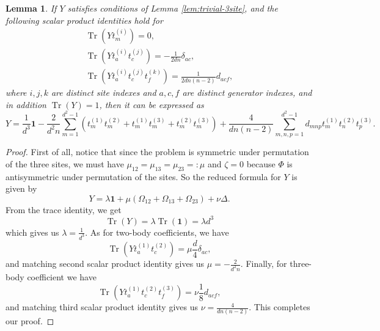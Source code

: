 \documentclass[11pt,letterpaper]{article}
\theoremstyle{plain}
\theoremstyle{plain}
\theoremstyle{plain}
\theoremstyle{plain}
\theoremstyle{plain}
\theoremstyle{plain}
\theoremstyle{plain}
\newtheorem{smlemma}[smtheorem]{Lemma}
\theoremstyle{definition}
\theoremstyle{plain}
\begin{document}
\begin{smlemma}\label{lem:covar_3-site_scalar_operator}
    If $Y$ satisfies conditions of Lemma \ref{lem:trivial-3site}, and the following scalar product identities hold for 
    \[
        \begin{gathered}
            \operatorname{Tr}\left(Y t_m^{(i)}\right)=0,\\
            \operatorname{Tr}\left(Y t_a^{(i)} t_c^{(j)}\right)=-\frac{1}{2 d n} \delta_{a c},\\
            \operatorname{Tr}\left(Y t_a^{(i)} t_c^{(j)} t_f^{(k)}\right)=\frac{1}{2 d n(n-2)} d_{a c f},
        \end{gathered}
    \]
    where $i, j, k$ are distinct site indexes and $a, c, f$ are distinct generator indexes, and in addition $\operatorname{Tr}(Y)=1$, then it can be expressed as
    \[
        Y=\frac{1}{d^3} \mathbf{1}-\frac{2}{d^2 n} \sum_{m=1}^{d^2-1}\left(t_m^{(1)} t_m^{(2)}+t_m^{(1)} t_m^{(3)}+t_m^{(2)} t_m^{(3)}\right)+\frac{4}{d n(n-2)} \sum_{m, n, p=1}^{d^2-1} d_{m n p} t_m^{(1)} t_n^{(2)} t_p^{(3)} .
    \]
\end{smlemma}

\begin{proof}
    First of all, notice that since the problem is symmetric under permutation of the three sites, we must have $\mu_{12}=\mu_{13}=\mu_{23}=: \mu$ 
    and $\zeta=0$ because $\Phi$ is antisymmetric under permutation of the sites. So the reduced formula for $Y$ is given by
    \[
        Y=\lambda \mathbf{1}+\mu\left(\Omega_{12}+\Omega_{13}+\Omega_{23}\right)+\nu \Delta.
    \]
    From the trace identity, we get
    \[
        \operatorname{Tr}(Y)=\lambda \operatorname{Tr}(\mathbf{1})=\lambda d^3
    \]
    which gives us $\lambda=\frac{1}{d^3}$.
    As for two-body coefficients, we have
    \[
        \operatorname{Tr}\left(Y t_a^{(1)} t_c^{(2)}\right)=\mu \frac{d}{4} \delta_{a c},
    \]
    and matching second scalar product identity gives us $\mu=-\frac{2}{d^2 n}$.
    Finally, for three-body coefficient we have
    \[
        \operatorname{Tr}\left(Y t_a^{(1)} t_c^{(2)} t_f^{(3)}\right)=\nu \frac{1}{8} d_{a c f},
    \]
    and matching third scalar product identity gives us $\nu=\frac{4}{d n(n-2)}$.
    This completes our proof.
\end{proof}
\end{document}
